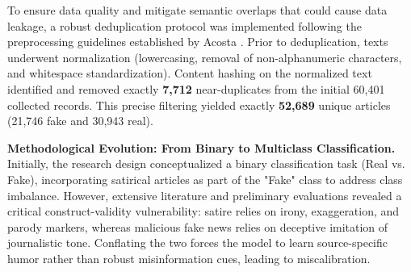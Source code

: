 \documentclass[informatics,article,submit,pdftex,moreauthors]{Definitions/mdpi}
\begin{document}
\begin{table}[H]
\centering
\caption{Exhaustive comparison of the characteristics of the corpora used in the construction of the unified dataset.}
\label{tab:comparacion_exhaustiva_corpus}
\end{table}

To ensure data quality and mitigate semantic overlaps that could cause data leakage, a robust deduplication protocol was implemented following the preprocessing guidelines established by Acosta \citep{acosta2019construccion}. Prior to deduplication, texts underwent normalization (lowercasing, removal of non-alphanumeric characters, and whitespace standardization). Content hashing on the normalized text identified and removed exactly \textbf{7,712} near-duplicates from the initial 60,401 collected records. This precise filtering yielded exactly \textbf{52,689} unique articles (21,746 fake and 30,943 real).

\textbf{Methodological Evolution: From Binary to Multiclass Classification.} 
Initially, the research design conceptualized a binary classification task (Real vs. Fake), incorporating satirical articles as part of the "Fake" class to address class imbalance. However, extensive literature and preliminary evaluations revealed a critical construct-validity vulnerability: satire relies on irony, exaggeration, and parody markers, whereas malicious fake news relies on deceptive imitation of journalistic tone. Conflating the two forces the model to learn source-specific humor rather than robust misinformation cues, leading to miscalibration.
\end{document}
